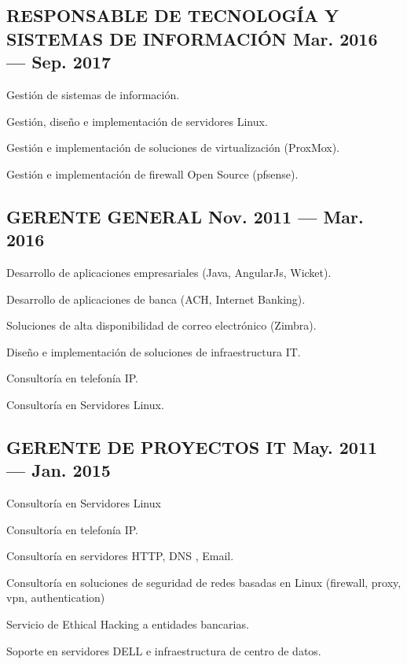 \documentclass[letter,10pt]{article}
\begin{document}
\subsection{{RESPONSABLE DE TECNOLOGÍA Y SISTEMAS DE INFORMACIÓN \hfill Mar. 2016 --- Sep. 2017}}
\begin{zitemize}
\item Gestión de sistemas de información.
\item Gestión, diseño e implementación de servidores Linux.
\item Gestión e implementación de soluciones de virtualización (ProxMox).
\item Gestión e implementación de firewall Open Source (pfsense).
\end{zitemize}
\vspace*{2mm}
\subsection{{GERENTE GENERAL \hfill Nov. 2011 --- Mar. 2016}}
\begin{zitemize}
\item	Desarrollo de aplicaciones empresariales (Java, AngularJs, Wicket).
\item	Desarrollo de aplicaciones de banca (ACH, Internet Banking).
\item	Soluciones de alta disponibilidad de correo electrónico (Zimbra).
\item	Diseño e implementación de soluciones de infraestructura IT.
\item	Consultoría en telefonía IP.
\item	Consultoría en Servidores Linux.
\end{zitemize}
\vspace*{2mm}
\subsection{{GERENTE DE  PROYECTOS IT \hfill May. 2011 --- Jan. 2015}}
\begin{zitemize}
\item	Consultoría en Servidores Linux
\item	Consultoría en telefonía IP.
\item	Consultoría en servidores HTTP, DNS , Email.
\item	Consultoría en  soluciones de seguridad de redes basadas en  Linux (firewall, proxy, vpn, authentication)
\item	Servicio de Ethical Hacking a entidades bancarias.
\item	Soporte en servidores DELL e infraestructura de centro de datos. 
\end{zitemize}
\vspace*{2mm}
\end{document}
